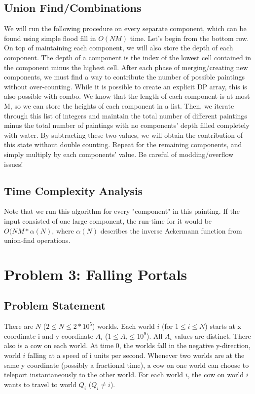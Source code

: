 \documentclass{article}
\begin{document}
\subsection{Union Find/Combinations}
We will run the following procedure on every separate component, which can be found using simple flood fill in $O(NM)$ time. Let's begin from the bottom row. On top of maintaining each component, we will also store the depth of each component. The depth of a component is the index of the lowest cell contained in the component minus the highest cell. After each phase of merging/creating new components, we must find a way to contribute the number of possible paintings without over-counting. While it is possible to create an explicit DP array, this is also possible with combo. We know that the length of each component is at most M, so we can store the heights of each component in a list. Then, we iterate through this list of integers and maintain the total number of different paintings minus the total number of paintings with no components' depth filled completely with water. By subtracting these two values, we will obtain the contribution of this state without double counting. 
Repeat for the remaining components, and simply multiply by each components' value. Be careful of modding/overflow issues!
 
\subsection{Time Complexity Analysis}
Note that we run this algorithm for every "component" in this painting. If the input consisted of one large component, the run-time for it would be $O(NM*\alpha(N)$, where $\alpha(N)$ describes the inverse Ackermann function from union-find operations.

\section{Problem 3: Falling Portals}

\subsection{Problem Statement}

There are $N$ ($2 \leq N \leq 2*10^5$) worlds. Each world $i$ (for $1 \leq i \leq N$) starts at x coordinate i and y coordinate $A_i$ ($1 \leq A_i \leq 10^9$). All $A_i$ values are distinct. There also is a cow on each world. At time 0, the worlds fall in the negative y-direction, world $i$ falling at a speed of i units per second. Whenever two worlds are at the same y coordinate (possibly a fractional time), a cow on one world can choose to teleport instantaneously to the other world. For each world $i$, the cow on world $i$ wants to travel to world $Q_i$ ($Q_i \neq i$).
\end{document}
